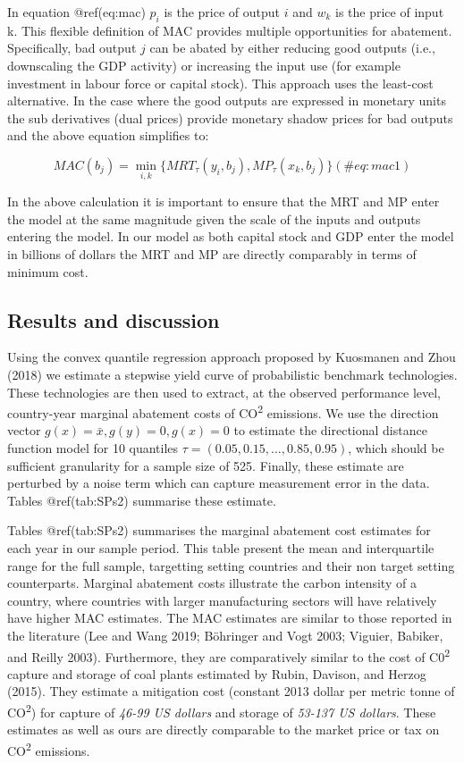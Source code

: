 \documentclass[
  10pt,
]{article}
\begin{document}
In equation @ref(eq:mac) \(p_{i}\) is the price of output \(i\) and
\(w_{k}\) is the price of input k. This flexible definition of MAC
provides multiple opportunities for abatement. Specifically, bad output
\(j\) can be abated by either reducing good outputs (i.e., downscaling
the GDP activity) or increasing the input use (for example investment in
labour force or capital stock). This approach uses the least-cost
alternative. In the case where the good outputs are expressed in
monetary units the sub derivatives (dual prices) provide monetary shadow
prices for bad outputs and the above equation simplifies to:

\begin{equation}
MAC(b_{j})=\displaystyle \min_{i,k}\{MRT_{\tau}(y_{i},b_{j}), MP_{\tau}(x_{k},b_{j})\} 
(\#eq:mac1)
\end{equation}

In the above calculation it is important to ensure that the MRT and MP
enter the model at the same magnitude given the scale of the inputs and
outputs entering the model. In our model as both capital stock and GDP
enter the model in billions of dollars the MRT and MP are directly
comparably in terms of minimum cost.

\hypertarget{results-and-discussion}{%
\subsection{Results and discussion}\label{results-and-discussion}}

Using the convex quantile regression approach proposed by Kuosmanen and
Zhou (2018) we estimate a stepwise yield curve of probabilistic
benchmark technologies. These technologies are then used to extract, at
the observed performance level, country-year marginal abatement costs of
CO\textsuperscript{2} emissions. We use the direction vector
\(g(x)=\bar{x}, g(y)=0, g(x)=0\) to estimate the directional distance
function model for 10 quantiles \(\tau=(0.05,0.15,\dots,0.85,0.95)\),
which should be sufficient granularity for a sample size of 525.
Finally, these estimate are perturbed by a noise term which can capture
measurement error in the data. Tables @ref(tab:SPs2) summarise these
estimate.

Tables @ref(tab:SPs2) summarises the marginal abatement cost estimates
for each year in our sample period. This table present the mean and
interquartile range for the full sample, targetting setting countries
and their non target setting counterparts. Marginal abatement costs
illustrate the carbon intensity of a country, where countries with
larger manufacturing sectors will have relatively have higher MAC
estimates. The MAC estimates are similar to those reported in the
literature (Lee and Wang 2019; Böhringer and Vogt 2003; Viguier,
Babiker, and Reilly 2003). Furthermore, they are comparatively similar
to the cost of C0\textsuperscript{2} capture and storage of coal plants
estimated by Rubin, Davison, and Herzog (2015). They estimate a
mitigation cost (constant 2013 dollar per metric tonne of
CO\textsuperscript{2}) for capture of \emph{46-99 US dollars} and
storage of \emph{53-137 US dollars}. These estimates as well as ours are
directly comparable to the market price or tax on CO\textsuperscript{2}
emissions.
\end{document}
